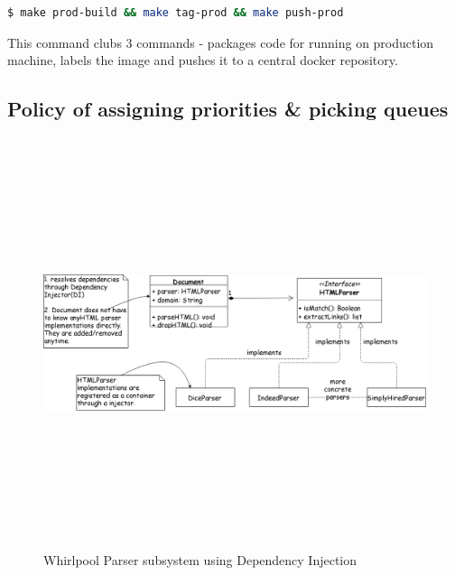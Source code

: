 \begin{lstlisting}[language=bash]
  $ make prod-build && make tag-prod && make push-prod
\end{lstlisting}
\noindent
This command clubs 3 commands - packages code for running on production machine, labels the image and pushes it to a central docker repository.

\pagebreak

\subsection{Policy of assigning priorities \& picking queues}
\begin{figure}[h!]
  \centering
  \includegraphics[width=15cm,height=12cm,keepaspectratio]{../media/crawler/docparsers.png}
  \caption{Whirlpool Parser subsystem using Dependency Injection}
  \label{fig:htmlparser}
\end{figure}

\pagebreak



